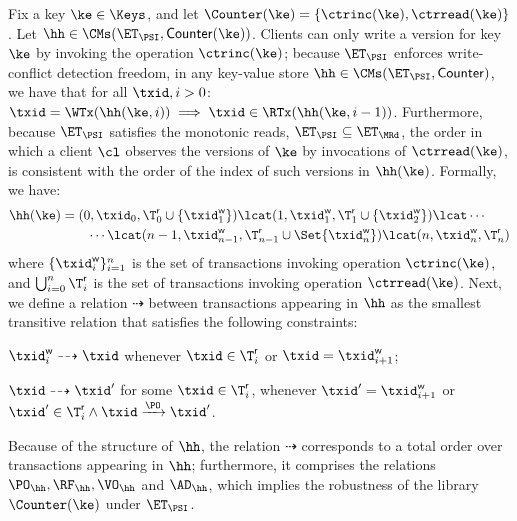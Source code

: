 Fix a key $\ke \in \Keys$, and let $\Counter(\ke) = \{\ctrinc(\ke), 
\ctrread(\ke)\}$. Let $\hh \in \CMs(\ET_{\PSI}, \mathsf{Counter}(\ke))$.
Clients can only write a version for key $\ke$ by invoking the 
operation $\ctrinc(\ke)$; because $\ET_{\PSI}$ 
enforces write-conflict detection freedom, in any key-value store 
$\hh \in \CMs(\ET_{\PSI}, \mathsf{Counter})$, we have that 
for all \( \txid, i > 0\):
$\txid = \WTx(\hh(\ke, i)) \implies \txid \in \RTx(\hh(\ke, i-1))$. 
Furthermore, because 
$\ET_{\PSI}$ satisfies the monotonic reads, 
$\ET_{\PSI} \subseteq \ET_{\MRd}$, the order in which 
a client $\cl$ observes the versions of $\ke$ by invocations of $\ctrread(\ke)$, 
is consistent with the order of the index of such versions in $\hh(\ke)$. 
Formally, we have:
\begin{align*}
\hh(\ke) & = (0, \txid_{0}, \T^{\mathsf{r}}_{0} \cup \{\txid^{\mathsf{w}}_1\}) 
\lcat (1, \txid^{\mathsf{w}}_{1}, \T^{\mathsf{r}}_{1} \cup \{\txid^{\mathsf{w}}_2\}) 
\lcat \cdots  \\
& \qquad \cdots \lcat (n-1, \txid^{\mathsf{w}}_{n-1}, \T^{\mathsf{r}}_{n-1} \cup \Set{\txid^{\mathsf{w}}_n})
\lcat (n, \txid^{\mathsf{w}}_n, \T^{\mathsf{r}}_{n})
\end{align*}
where $\{\txid^{\mathsf{w}}_{i}\}_{i=1}^{n}$ is the 
set of transactions invoking operation $\ctrinc(\ke)$, and $\bigcup_{i=0}^{n} 
\T^{\mathsf{r}}_{i}$ is the set of transactions invoking operation $\ctrread(\ke)$. 
Next, we define a relation $\dashrightarrow$ between
transactions appearing in $\hh$ as the smallest transitive relation that 
satisfies the following constraints: 
\begin{enumerate*}
\item $\txid^{\mathsf{w}}_{i} 
\dashrightarrow \txid$ whenever $\txid \in \T^{\mathsf{r}}_{i}$ 
or $\txid = \txid^{\mathsf{w}}_{i+1}$; 
\item $\txid \dashrightarrow \txid'$ 
for some $\txid \in \T^{\mathsf{r}}_{i}$,
whenever $\txid' = \txid^{\mathsf{w}}_{i+1}$
or $\txid' \in \T^{\mathsf{r}}_{i} \land \txid \xrightarrow{\PO} \txid'$. 
\end{enumerate*}
Because of the structure of $\hh$, the relation $\dashrightarrow$ corresponds to a 
total order over transactions appearing in $\hh$; furthermore, it comprises 
the relations $\PO_{\hh}, \RF_{\hh}, \VO_{\hh}$ and $\AD_{\hh}$, which implies 
the robustness of the library $\Counter(\ke)$ under $\ET_{\PSI}$.


